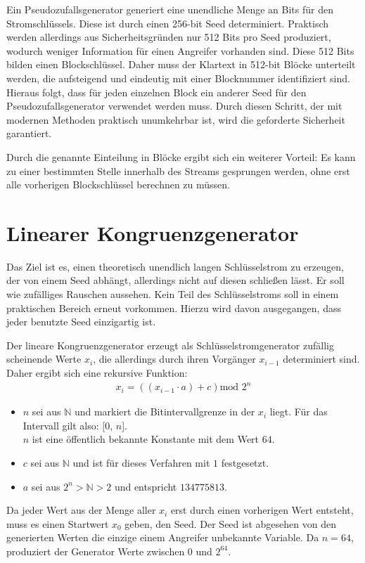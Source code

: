 \documentclass[10pt,a4paper]{article}
\begin{document}
\medskip
Ein Pseudozufallsgenerator generiert eine unendliche Menge an Bits für den Stromschlüssels.
Diese ist durch einen 256-bit Seed determiniert.
Praktisch werden allerdings aus Sicherheitsgründen nur 512 Bits pro Seed produziert, wodurch weniger Information für einen Angreifer vorhanden sind.
Diese 512 Bits bilden einen Blockschlüssel.
Daher muss der Klartext in 512-bit Blöcke unterteilt werden, die aufsteigend und eindeutig mit einer Blocknummer identifiziert sind.
Hieraus folgt, dass für jeden einzelnen Block ein anderer Seed für den Pseudozufallsgenerator verwendet werden muss.
Durch diesen Schritt, der mit modernen Methoden praktisch unumkehrbar ist, wird die geforderte Sicherheit garantiert.

Durch die genannte Einteilung in Blöcke ergibt sich ein weiterer Vorteil:
Es kann zu einer bestimmten Stelle innerhalb des Streams gesprungen werden, ohne erst alle vorherigen Blockschlüssel berechnen zu müssen.

\section{Linearer Kongruenzgenerator}

Das Ziel ist es, einen theoretisch unendlich langen Schlüsselstrom zu erzeugen, der von einem Seed abhängt, allerdings nicht auf diesen schließen lässt.
Er soll wie zufälliges Rauschen aussehen.
Kein Teil des Schlüsselstroms soll in einem praktischen Bereich erneut vorkommen.
Hierzu wird davon ausgegangen, dass jeder benutzte Seed einzigartig ist.

\medskip
Der lineare Kongruenzgenerator erzeugt als Schlüsselstromgenerator zufällig scheinende Werte $x_i$, die allerdings durch ihren Vorgänger $x_{i-1}$ determiniert sind.
Daher ergibt sich eine rekursive Funktion:
\begin{align*}
    x_i = \left(\left(x_{i-1} \cdot a\right) + c\right) \text{mod } 2^n
\end{align*}
\begin{itemize}
    \item $n$ sei aus $\mathbb{N}$ und markiert die Bitintervallgrenze in der $x_i$ liegt.
          Für das Intervall gilt also: [0, $n$]. \\
          $n$ ist eine öffentlich bekannte Konstante mit dem Wert $64$.
    \item $c$ sei aus $\mathbb{N}$ und ist für dieses Verfahren mit $1$ festgesetzt.
    \item $a$ sei aus $2^n>\mathbb{N}>2$ und entspricht $134775813$.
\end{itemize}
Da jeder Wert aus der Menge aller $x_i$ erst durch einen vorherigen Wert entsteht, muss es einen Startwert $x_0$ geben, den Seed.
Der Seed ist abgesehen von den generierten Werten die einzige einem Angreifer unbekannte Variable.
Da $n = 64$, produziert der Generator Werte zwischen $0$ und $2^{64}$.
\end{document}
